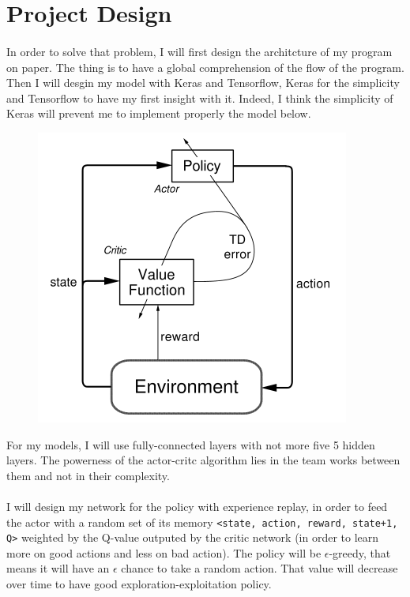 \documentclass{article}
\begin{document}
	\section{Project Design}
  \paragraph{}

  In order to solve that problem, I will first design the architcture of my program
  on paper. The thing is to have a global comprehension of the flow of the program.
  Then I will desgin my model with Keras and Tensorflow, Keras for the simplicity
  and Tensorflow to have my first insight with it. Indeed, I think the simplicity
  of Keras will prevent me to implement properly the model below.

  \begin{figure}[ht]
    \centering
    \includegraphics[width=.5\textwidth,height=.5\textheight,keepaspectratio]{actor-critic.png}
  \end{figure}

  For my models, I will use fully-connected layers with not more five 5 hidden
  layers. The powerness of the actor-critc algorithm lies in the team works
  between them and not in their complexity.
  \paragraph{}
  I will design my network for the policy with experience replay, in order to
  feed the actor with a random set of its memory \verb?<state, action, reward, state+1, Q>?
  weighted by the Q-value outputed by the critic network (in order to learn more
  on good actions and less on bad action). The policy will be $\epsilon$-greedy,
  that means it will have an $\epsilon$ chance to take a random action.
  That value will decrease over time to have good exploration-exploitation policy.

  
  
  
  \printglossary
\end{document}
